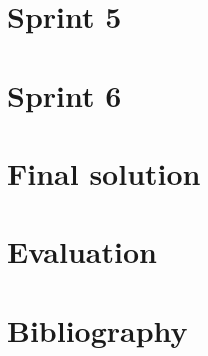 \documentclass[11pt,a4paper,titlepage,oneside]{report}
\begin{document}
\chapter{Sprint 5}

\chapter{Sprint 6}

\chapter{Final solution}

\chapter{Evaluation}



\chapter{Bibliography}
\begin{flushleft}
	
\end{flushleft}

\appendix
\end{document}
